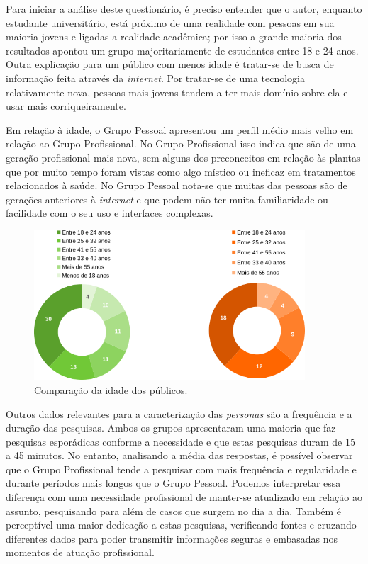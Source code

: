 Para iniciar a análise deste questionário, é preciso entender que o autor, enquanto estudante universitário, está próximo de uma realidade com pessoas em sua maioria jovens e ligadas a realidade acadêmica; por isso a grande maioria dos resultados apontou um grupo majoritariamente de estudantes entre 18 e 24 anos. Outra explicação para um público com menos idade é tratar-se de busca de informação feita através da \emph{internet}. Por tratar-se de uma tecnologia relativamente nova, pessoas mais jovens tendem a ter mais domínio sobre ela e usar mais corriqueiramente.

Em relação à idade, o Grupo Pessoal apresentou um perfil médio mais velho em relação ao Grupo Profissional. No Grupo Profissional isso indica que são de uma geração profissional mais nova, sem alguns dos preconceitos em relação às plantas que por muito tempo foram vistas como algo místico ou ineficaz em tratamentos relacionados à saúde. No Grupo Pessoal nota-se que muitas das pessoas são de gerações anteriores à \emph{internet} e que podem não ter muita familiaridade ou facilidade com o seu uso e interfaces complexas.

\begin{figure}[!htbp]
\centering
\caption{\label{graf-idade}Comparação da idade dos públicos.}
\includegraphics[width=0.9\textwidth]{images/drive/image_13.png}
\end{figure}


Outros dados relevantes para a caracterização das \emph{personas} são a frequência e a duração das pesquisas. Ambos os grupos apresentaram uma maioria que faz pesquisas esporádicas conforme a necessidade e que estas pesquisas duram de 15 a 45 minutos. No entanto, analisando a média das respostas, é possível observar que o Grupo Profissional tende a pesquisar com mais frequência e regularidade e durante períodos mais longos que o Grupo Pessoal. Podemos interpretar essa diferença com uma necessidade profissional de manter-se atualizado em relação ao assunto, pesquisando para além de casos que surgem no dia a dia. Também é perceptível uma maior dedicação a estas pesquisas, verificando fontes e cruzando diferentes dados para poder transmitir informações seguras e embasadas nos momentos de atuação profissional.

